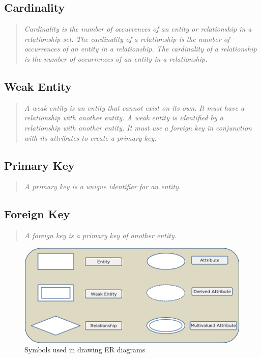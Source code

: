 \documentclass[11pt]{article}
\begin{document}
\subsection{Cardinality}
\begin{quote}
	\textit{Cardinality is the number of occurrences of an entity or relationship in a relationship set. The cardinality of a relationship is the number of occurrences of an entity in a relationship. The cardinality of a relationship is the number of occurrences of an entity in a relationship.}
\end{quote}

\subsection{Weak Entity}
\begin{quote}
	\textit{A weak entity is an entity that cannot exist on its own. It must have a relationship with another entity. A weak entity is identified by a relationship with another entity. It must use a foreign key in conjunction with its attributes to create a primary key.}
\end{quote}

\subsection{Primary Key}
\begin{quote}
	\textit{A primary key is a unique identifier for an entity.}
\end{quote}

\subsection{Foreign Key}
\begin{quote}
	\textit{A foreign key is a primary key of another entity.}
\end{quote}

\begin{figure}[H]
	\centering
	\includegraphics[scale=0.5]{ERDiagramsInDBMS_2.png}
	\caption{Symbols used in drawing ER diagrams}
\end{figure}
\end{document}
